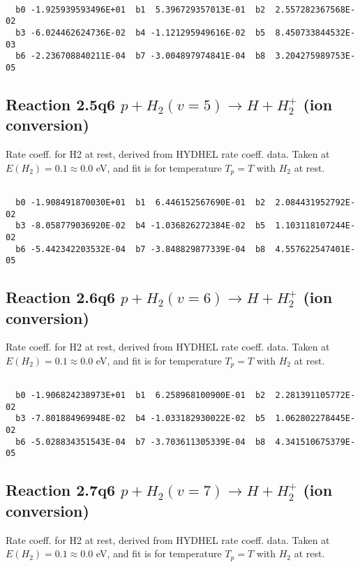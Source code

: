 \documentclass[12pt,dvipdfmx]{article}
\begin{document}
\begin{small}\begin{verbatim}

  b0 -1.925939593496E+01  b1  5.396729357013E-01  b2  2.557282367568E-02
  b3 -6.024462624736E-02  b4 -1.121295949616E-02  b5  8.450733844532E-03
  b6 -2.236708840211E-04  b7 -3.004897974841E-04  b8  3.204275989753E-05

\end{verbatim}\end{small}

\newpage
\subsection{
Reaction 2.5q6
$ p + H_2(v=5) \rightarrow H + H_2^+$ (ion conversion)
}
Rate coeff. for H2 at rest, derived from HYDHEL rate coeff. data.
Taken at $E(H_2) = 0.1 \approx 0.0$ eV,  and fit is for temperature $T_p=T$ with $H_2$ at rest.

\begin{small}\begin{verbatim}

  b0 -1.908491870030E+01  b1  6.446152567690E-01  b2  2.084431952792E-02
  b3 -8.058779036920E-02  b4 -1.036826272384E-02  b5  1.103118107244E-02
  b6 -5.442342203532E-04  b7 -3.848829877339E-04  b8  4.557622547401E-05

\end{verbatim}\end{small}

\newpage
\subsection{
Reaction 2.6q6
$ p + H_2(v=6) \rightarrow H + H_2^+$ (ion conversion)
}
Rate coeff. for H2 at rest, derived from HYDHEL rate coeff. data.
Taken at $E(H_2) = 0.1 \approx 0.0$ eV,  and fit is for temperature $T_p=T$ with $H_2$ at rest.

\begin{small}\begin{verbatim}

  b0 -1.906824238973E+01  b1  6.258968100900E-01  b2  2.281391105772E-02
  b3 -7.801884969948E-02  b4 -1.033182930022E-02  b5  1.062802278445E-02
  b6 -5.028834351543E-04  b7 -3.703611305339E-04  b8  4.341510675379E-05

\end{verbatim}\end{small}

\newpage
\subsection{
Reaction 2.7q6
$ p + H_2(v=7) \rightarrow H + H_2^+$ (ion conversion)
}
Rate coeff. for H2 at rest, derived from HYDHEL rate coeff. data.
Taken at $E(H_2) = 0.1 \approx 0.0$ eV,  and fit is for temperature $T_p=T$ with $H_2$ at rest.
\end{document}
